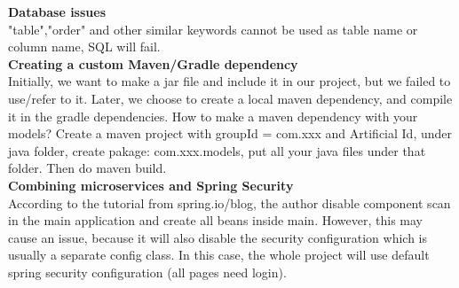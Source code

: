 \documentclass[12pt]{article}
\begin{document}
\noindent\textbf{Database issues}\\
"table","order" and other similar keywords cannot be used as table name or column name, SQL will fail.\\

\noindent\textbf{Creating a custom Maven/Gradle dependency}\label{iss:mavenrepo}\\
Initially, we want to make a jar file and include it in our project, but we failed to use/refer to it. Later, we choose to create a local maven dependency, and compile it in the gradle dependencies.
How to make a maven dependency with your models?
Create a maven project with groupId = com.xxx and Artificial Id, under java folder, create pakage: com.xxx.models, put all your java files under that folder. Then do maven build.\\

\noindent\textbf{Combining microservices and Spring Security}\\
According to the tutorial from spring.io/blog, the author disable component scan in the main application and create all beans inside main.
However, this may cause an issue, because it will also disable the security configuration which is usually a separate config class. In this case, the whole project will use default spring security configuration (all pages need login).
\end{document}
